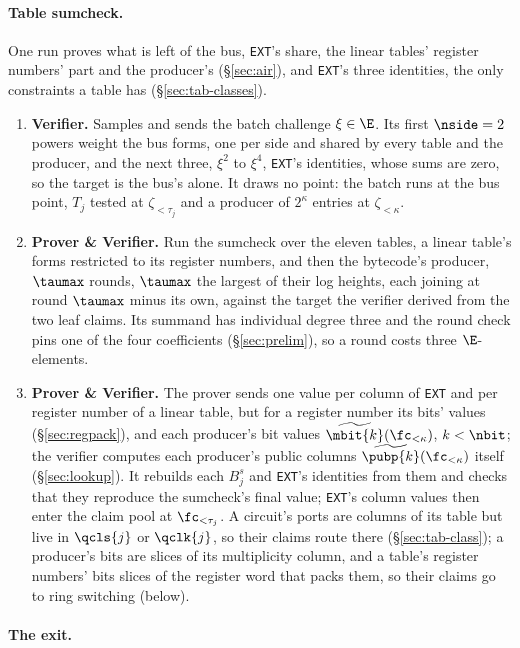 \paragraph{Table sumcheck.} One run proves what is left of the bus, \texttt{EXT}'s share, the linear tables' register numbers' part and the producer's (\S\ref{sec:air}), and \texttt{EXT}'s three identities, the only constraints a table has (\S\ref{sec:tab-classes}).
\begin{enumerate}
\item \textbf{Verifier.} Samples and sends the batch challenge $\xi\in\E$. Its first $\nside=2$ powers weight the bus forms, one per side and shared by every table and the producer, and the next three, $\xi^{2}$ to $\xi^{4}$, \texttt{EXT}'s identities, whose sums are zero, so the target is the bus's alone. It draws no point: the batch runs at the bus point, $T_j$ tested at $\zeta_{<\tau_j}$ and a producer of $2^{\kappa}$ entries at $\zeta_{<\kappa}$.
\item \textbf{Prover \& Verifier.} Run the sumcheck over the eleven tables, a linear table's forms restricted to its register numbers, and then the bytecode's producer, $\taumax$ rounds, $\taumax$ the largest of their log heights, each joining at round $\taumax$ minus its own, against the target the verifier derived from the two leaf claims. Its summand has individual degree three and the round check pins one of the four coefficients (\S\ref{sec:prelim}), so a round costs three $\E$-elements.
\item \textbf{Prover \& Verifier.} The prover sends one value per column of \texttt{EXT} and per register number of a linear table, but for a register number its bits' values (\S\ref{sec:regpack}), and each producer's bit values $\widetilde{\mbit{k}}(\fc_{<\kappa})$, $k<\nbit$; the verifier computes each producer's public columns $\widetilde{\pubp{k}}(\fc_{<\kappa})$ itself (\S\ref{sec:lookup}). It rebuilds each $B^{s}_j$ and \texttt{EXT}'s identities from them and checks that they reproduce the sumcheck's final value; \texttt{EXT}'s column values then enter the claim pool at $\fc_{<\tau_j}$. A circuit's ports are columns of its table but live in $\qcls{j}$ or $\qclk{j}$, so their claims route there (\S\ref{sec:tab-class}); a producer's bits are slices of its multiplicity column, and a table's register numbers' bits slices of the register word that packs them, so their claims go to ring switching (below).
\end{enumerate}

\paragraph{The exit.}

